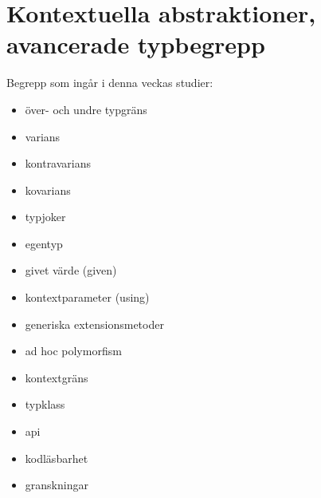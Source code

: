 \chapter{Kontextuella abstraktioner, avancerade typbegrepp}\label{chapter:W11}
Begrepp som ingår i denna veckas studier:
\begin{itemize}[noitemsep,label={$\square$},leftmargin=*]
\item över- och undre typgräns
\item varians
\item kontravarians
\item kovarians
\item typjoker
\item egentyp
\item givet värde (given)
\item kontextparameter (using)
\item generiska extensionsmetoder
\item ad hoc polymorfism
\item kontextgräns
\item typklass
\item api
\item kodläsbarhet
\item granskningar\end{itemize}
